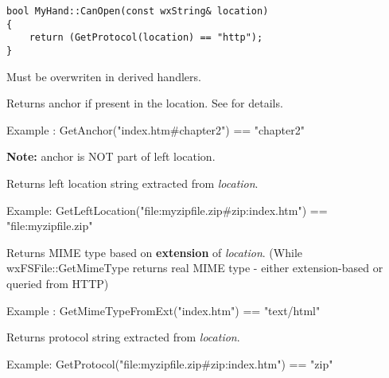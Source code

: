 \begin{verbatim}
bool MyHand::CanOpen(const wxString& location) 
{
    return (GetProtocol(location) == "http");
}
\end{verbatim}

Must be overwriten in derived handlers.

\label{wxfilesystemhandlergetanchor}


Returns anchor if present in the location.
See  for details.

Example : GetAnchor("index.htm\#chapter2") == "chapter2"

{\bf Note:} anchor is NOT part of left location.

\label{wxfilesystemhandlergetleftlocation}


Returns left location string extracted from {\it location}. 

Example: GetLeftLocation("file:myzipfile.zip\#zip:index.htm") == "file:myzipfile.zip"

\label{wxfilesystemhandlergetmimetypefromext}


Returns MIME type based on {\bf extension} of {\it location}. (While wxFSFile::GetMimeType
returns real MIME type - either extension-based or queried from HTTP)

Example : GetMimeTypeFromExt("index.htm") == "text/html"

\label{wxfilesystemhandlergetprotocol}


Returns protocol string extracted from {\it location}. 

Example: GetProtocol("file:myzipfile.zip\#zip:index.htm") == "zip"

\label{wxfilesystemhandlergetrightlocation}


